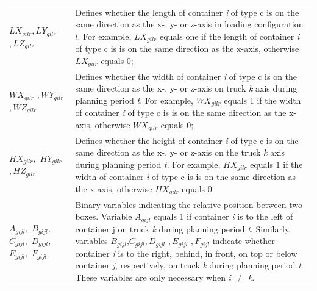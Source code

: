 \begin{longtable}[hbt!]{  |p{}|p{}  |}
  \textit{$LX_{gilr},LY_{gilr}$ $,LZ_{gilr}$}                                                    & Defines whether the length of container \textit{i} of type c is on the same direction as the x-, y- or z-axis in loading configuration $l$. For example, $LX_{gilr}$ equals one if the length of container \textit{i} of type c is is on the same direction as the x-axis, otherwise $LX_{gilr}$ equals 0;                                                                                                                                                                                                                                                                     \\[0.15cm]
  $WX_{gilr}$ $,WY_{gilr}$ $,WZ_{gilr}$                                                          & Defines whether the width of container \textit{i} of type c is on the same direction as the x-, y- or z-axis on truck \textit{k} axis during planning period \textit{t}. For example, $WX_{gilr}$ equals 1 if the width of  container \textit{i} of type c is is on the same direction as the x-axis, otherwise $WX_{gilr}$ equals 0;                                                                                                                                                                                                                                          \\[0.25cm]
  \textit{$HX_{gilr}, $ $ HY_{gilr}$ $,HZ_{gilr}$}                                               & Defines whether the height of container \textit{i} of type c is on the same direction as the x-, y- or z-axis on the truck \textit{k} axis during planning period \textit{t}. For example, $HX_{gilr}$ equals 1 if the width of container \textit{i} of type c is is on the same direction as the x-axis, otherwise $HX_{gilr}$ equals 0                                                                                                                                                                                                                                       \\[0.15cm]
  $A_{g i j l}, $ $ B_{g i j l}, $ $C_{g i j l}, $ $ D_{g i j l},$ $E_{g i j l}, $ $F_{g i j l}$ & Binary variables indicating the relative position between two boxes. Variable $A_{g i j l}$ equals 1 if container \textit{i} is to the left of container j on truck \textit{k} during planning period \textit{t}. Similarly, variables $B_{g i j l}$,$C_{g i j l}$$, D_{g i j l}$ $, E_{g i j l}$ $, F_{g i j l}$ indicate whether container \textit{i} is to the right, behind, in front, on top or below container \textit{j}, respectively, on truck \textit{k} during planning period \textit{t}. These variables are only necessary when \textit{i} $\not = $ \textit{k}. \\[0.15cm]
  \hline
\end{longtable}

